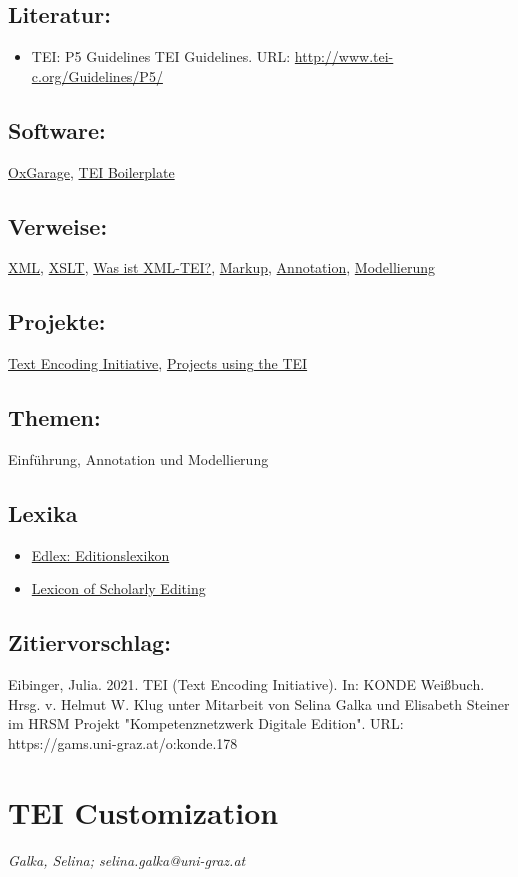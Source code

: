 \documentclass{article}
\begin{document}
        \subsection*{Literatur:}\begin{itemize}\item TEI: P5 Guidelines TEI Guidelines. URL: \url{http://www.tei-c.org/Guidelines/P5/}\end{itemize}\subsection*{Software:}\href{https://oxgarage.tei-c.org/}{OxGarage}, \href{http://dcl.ils.indiana.edu/teibp/index.html}{TEI Boilerplate}\subsection*{Verweise:}\href{https://gams.uni-graz.at/o:konde.215}{XML}, \href{https://gams.uni-graz.at/o:konde.86}{XSLT}, \href{https://gams.uni-graz.at/o:konde.79}{Was ist XML-TEI?}, \href{https://gams.uni-graz.at/o:konde.126}{Markup}, \href{https://gams.uni-graz.at/o:konde.17}{Annotation}, \href{https://gams.uni-graz.at/o:konde.137}{Modellierung}\subsection*{Projekte:}\href{https://tei-c.org}{Text Encoding Initiative}, \href{https://tei-c.org/activities/projects/}{Projects using the TEI}\subsection*{Themen:}Einführung, Annotation und Modellierung\subsection*{Lexika}\begin{itemize}\item \href{https://edlex.de/index.php?title=Text_Encoding_Initiative_(TEI)}{Edlex: Editionslexikon}\item \href{https://lexiconse.uantwerpen.be/index.php/lexicon/tei/}{Lexicon of Scholarly Editing}\end{itemize}\subsection*{Zitiervorschlag:}Eibinger, Julia. 2021. TEI (Text Encoding Initiative). In: KONDE Weißbuch. Hrsg. v. Helmut W. Klug unter Mitarbeit von Selina Galka und Elisabeth Steiner im HRSM Projekt "Kompetenznetzwerk Digitale Edition". URL: https://gams.uni-graz.at/o:konde.178\newpage\section*{TEI Customization} \emph{Galka, Selina; selina.galka@uni-graz.at }\\
        
\end{document}
